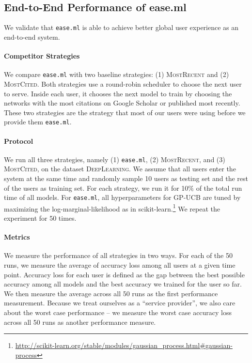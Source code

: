 \documentclass[letterpaper]{vldb}
\newcommand{\eml}{\texttt{ease.ml}\xspace}
\begin{document}
\subsection{End-to-End Performance of ease.ml}

We validate that \eml is able to achieve
better global user experience as
an end-to-end system.

\vspace{-1em}
\paragraph*{Competitor Strategies}
We compare \eml with two baseline strategies:
(1) \textsc{MostRecent} and (2) \textsc{MostCited}.
Both strategies use a round-robin scheduler
to choose the next user to serve. Inside
each user, it chooses the next model to train
by choosing the networks with the
most citations on Google Scholar or
published most recently. These two strategies
are the strategy that most of our users
were using before we provide them \eml.

\vspace{-1em}
\paragraph*{Protocol} We run all
three strategies, namely (1) \eml,
(2) \textsc{MostRecent}, and (3) 
\textsc{MostCited}, on the 
dataset \textsc{DeepLearning}.
We assume that all users enter the system 
at the same time and randomly sample
10 users as testing set and the rest of the
users as training set. For each
strategy, we run it for 10\% of the
total run time of all models.
For \eml, all hyperparameters 
for GP-UCB are tuned by
maximizing the log-marginal-likelihood
as in scikit-learn.\footnote{\scriptsize
\url{http://scikit-learn.org/stable/modules/gaussian_process.html#gaussian-process}}
We repeat the experiment for 50 times. 

\vspace{-1em}
\paragraph*{Metrics} We measure the performance
of all strategies in two ways.
For each of the 50 runs, we
measure the average of accuracy loss
among all users at a given time
point. Accuracy loss for each user
is defined as the gap between
the best possible accuracy among all
models and the best accuracy we
trained for the user so far. We
then measure the average across
all 50 runs as the first performance
measurement. Because
we treat ourselves as a ``service provider'',
we also care about the worst case
performance -- we measure the
worst case accuracy loss 
across all 50 runs as another performance
measure.
\end{document}
